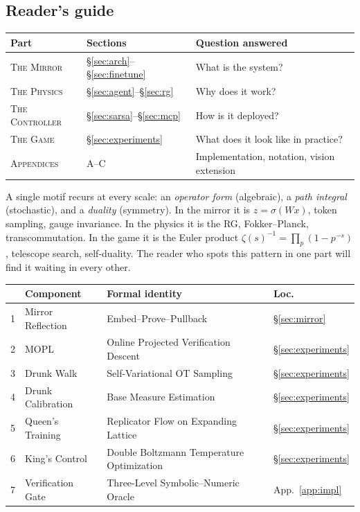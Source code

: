 \documentclass[11pt,a4paper]{article}
\begin{document}
\subsection{Reader's guide}\label{sec:guide}

\begin{center}
\small
\begin{tabular}{@{}lll@{}}
\toprule
\textbf{Part} & \textbf{Sections} & \textbf{Question answered} \\
\midrule
\textsc{The Mirror}
  & \S\ref{sec:arch}--\S\ref{sec:finetune}
  & What is the system? \\
\textsc{The Physics}
  & \S\ref{sec:agent}--\S\ref{sec:rg}
  & Why does it work? \\
\textsc{The Controller}
  & \S\ref{sec:sarsa}--\S\ref{sec:mcp}
  & How is it deployed? \\
\textsc{The Game}
  & \S\ref{sec:experiments}
  & What does it look like in practice? \\
\textsc{Appendices}
  & A--C
  & Implementation, notation, vision extension \\
\bottomrule
\end{tabular}
\end{center}

\noindent
A single motif recurs at every scale:
an \emph{operator form} (algebraic),
a \emph{path integral} (stochastic),
and a \emph{duality} (symmetry).
In the mirror it is $z = \sigma(Wx)$, token sampling,
gauge invariance.
In the physics it is the RG, Fokker--Planck,
transcommutation.
In the game it is the Euler product
$\zeta(s)^{-1} = \prod_p(1-p^{-s})$,
telescope search, self-duality.
The reader who spots this pattern in one part
will find it waiting in every other.

\medskip
\begin{center}
\small
\begin{tabular}{@{}clll@{}}
\toprule
& \textbf{Component} & \textbf{Formal identity}
  & \textbf{Loc.} \\
\midrule
1 & Mirror Reflection
  & Embed--Prove--Pullback
  & \S\ref{sec:mirror} \\
2 & MOPL
  & Online Projected Verification Descent
  & \S\ref{sec:experiments} \\
3 & Drunk Walk
  & Self-Variational OT Sampling
  & \S\ref{sec:experiments} \\
4 & Drunk Calibration
  & Base Measure Estimation
  & \S\ref{sec:experiments} \\
5 & Queen's Training
  & Replicator Flow on Expanding Lattice
  & \S\ref{sec:experiments} \\
6 & King's Control
  & Double Boltzmann Temperature Optimization
  & \S\ref{sec:experiments} \\
7 & Verification Gate
  & Three-Level Symbolic--Numeric Oracle
  & App.~\ref{app:impl} \\
\bottomrule
\end{tabular}
\end{center}
\end{document}
